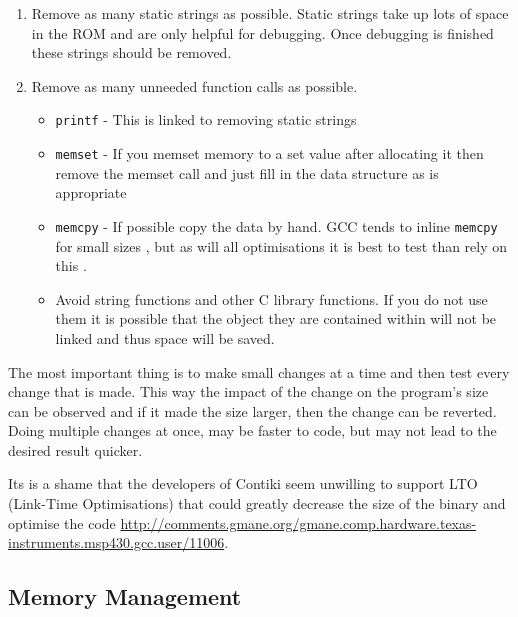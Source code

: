 \begin{enumerate}
\item Remove as many static strings as possible. Static strings take up lots of space in the ROM and are only helpful for debugging. Once debugging is finished these strings should be removed.
\item Remove as many unneeded function calls as possible.
\begin{itemize}
\item \verb|printf| - This is linked to removing static strings
\item \verb|memset| - If you memset memory to a set value after allocating it then remove the memset call and just fill in the data structure as is appropriate
\item \verb|memcpy| - If possible copy the data by hand. GCC tends to inline \verb|memcpy| for small sizes \cite{?}, but as will all optimisations it is best to test than rely on this \cite{?}.
\item Avoid string functions and other C library functions. If you do not use them it is possible that the object they are contained within will not be linked and thus space will be saved. \cite{?}
\end{itemize}
\end{enumerate}

The most important thing is to make small changes at a time and then test every change that is made. This way the impact of the change on the program's size can be observed and if it made the size larger, then the change can be reverted. Doing multiple changes at once, may be faster to code, but may not lead to the desired result quicker.


Its is a shame that the developers of Contiki seem unwilling to support LTO (Link-Time Optimisations) that could greatly decrease the size of the binary and optimise the code \url{http://comments.gmane.org/gmane.comp.hardware.texas-instruments.msp430.gcc.user/11006}.

\subsection{Memory Management}

